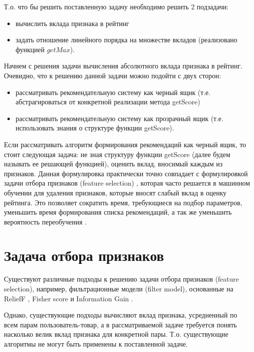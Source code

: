 \documentclass[12pt,a4paper]{report}
\begin{document}
Т.о. что бы решить поставленную задачу необходимо решить 2 подзадачи:

\begin{itemize}
\item вычислить вклада признака в рейтинг
\item задать отношение линейного порядка на множестве вкладов (реализовано функцией $getMax$).
\end{itemize}

Начнем с решения задачи вычисления абсолютного вклада признака в рейтинг. Очевидно, что к решению данной задачи можно подойти с двух сторон:
\begin{itemize}
\item рассматривать рекомендательную систему как черный ящик (т.е. абстрагироваться от конкретной реализации метода getScore)
\item рассматривать рекомендательную систему как прозрачный ящик (т.е. использовать знания о структуре функции getScore).
\end{itemize}

Если рассматривать алгоритм формирования рекомендаций как черный ящик, то стоит следующая задача: не зная структуру функции getScore (далее будем называть ее решающей функцией), оценить вклад, вносимый каждым из признаков.
Данная формулировка практически точно совпадает с формулировкой задачи отбора признаков (feature selection) \cite{AdvFeatureSelectionResearch}, которая часто решается в машинном обучении для удаления признаков, которые вносят слабый вклад в оценку рейтинга. Это позволяет сократить время, требующиеся на подбор параметров, уменьшить время формирования списка рекомендаций, а так же уменьшить вероятность переобучения \cite{Voron}.

\section{Задача отбора признаков}
Существуют различные подходы к решению задачи отбора признаков (feature selection), например, фильтрационные модели (filter model), основанные на ReliefF \cite{ReliefF}, Fisher score \cite{Fisher} и Information Gain \cite{Gain}.

Однако, существующие подходы вычисляют вклад признака, усредненный по всем парам пользователь-товар, а в рассматриваемой задаче требуется понять насколько велик вклад признака для конкретной пары.
Т.о. существующие алгоритмы не могут быть применены к поставленной задаче.
\end{document}
